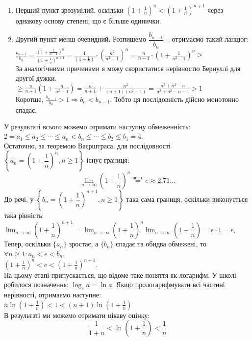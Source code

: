 \documentclass[a4paper, 14pt]{article}
\theoremstyle{theoremdd}
\theoremstyle{theoremdd}
\theoremstyle{theoremdd}
\theoremstyle{theoremdd}
\theoremstyle{theoremdd}
\theoremstyle{theoremdd}
\theoremstyle{theoremdd}
\theoremstyle{theoremdd}
\begin{document}
	\begin{enumerate}[wide=0pt, label={\alph*)}]
	\item Перший пункт зрозумілий, оскільки $\displaystyle \left(1+\frac{1}{n} \right)^n < \left(1+\frac{1}{n} \right)^{n+1}$ через однакову основу степені, що є більше одинички.
	\item Другий пункт менш очевидний. Розпишемо $\dfrac{b_{n-1}}{b_n}$ -- отримаємо такий ланцюг:\\
	$\displaystyle \frac{b_{n-1}}{b_n} = \frac{\displaystyle \left(1+\frac{1}{n-1} \right)^{n}}{\displaystyle \left(1+\frac{1}{n} \right)^{n+1}} = \frac{1}{\displaystyle \left(1+\frac{1}{n}\right)} \cdot \left(\frac{n^2}{n^2-1}\right)^n = \frac{n}{n+1} \cdot \left(1+\frac{1}{n^2-1} \right)^n \boxed{\geq}$\\
	За аналогічними причинами я можу скористатися нерівностю Бернуллі для другої дужки.\\
	$\displaystyle \boxed{\geq} \frac{n}{n+1} \left(1+\frac{n}{n^2-1}\right) = \frac{n}{n+1} + \frac{n^2}{(n+1)(n^2-1)} = \frac{n^3+n^2-n}{n^3+n^2-n-1} > 1$\\
	Коротше, $\displaystyle \frac{b_{n-1}}{b_n} > 1 \Rightarrow b_n < b_{n-1}$. Тобто ця послідовність дійсно монотонно спадає.
	\end{enumerate}
	
	У результаті всього можемо отримати наступну обмеженність:\\
	$2=a_1 \leq a_2 \leq \cdots \leq a_n < b_n \leq \cdots \leq b_2 \leq b_1 = 4$.
	\bigskip \\
	Остаточно, за теоремою Ваєрштраса, для послідовності $\left\{a_n = \left(1 + \dfrac{1}{n} \right)^n, n \geq 1 \right\}$ існує границя:
	$$\displaystyle \lim_{n \to \infty}\left(1+\frac{1}{n} \right)^n \overset{\text{позн.}}{=} e \approx 2.71...$$
	До речі, у $\left\{b_n = \left( 1 + \dfrac{1}{n} \right)^{n+1}, n \geq 1 \right\}$ така сама границя, оскільки виконується така рівність: \\ $\displaystyle\lim_{n \to \infty} \left( 1 + \dfrac{1}{n} \right)^{n+1} = \lim_{n \to \infty} \left( 1 + \dfrac{1}{n} \right)^n \lim_{n \to \infty} \left(1 + \dfrac{1}{n} \right) = e \cdot 1 = e$.
	\bigskip \\	
	Тепер, оскільки $\{a_n \}$ зростає, а $\{b_n \}$ спадає та обидва обмежені, то $\forall n \geq 1: a_n<e<b_n$.\\
	$\displaystyle \left(1+\frac{1}{n} \right)^n < e < \left(1+\frac{1}{n} \right)^{n+1}$.\\
	На цьому етапі припускається, що відоме таке поняття як логарифм. У школі робилося позначення: $\log_{e} a =\ln a$. Якщо прологарифмувати всі частині нерівності, отримаємо наступне:\\
	$\displaystyle n \ln \left(1+\frac{1}{n} \right) < 1 < (n+1) \ln \left(1+\frac{1}{n} \right)$\\
	В результаті ми можемо отримати цікаву оцінку:
	$$\frac{1}{1+n} < \ln (1+\frac{1}{n}) < \frac{1}{n}$$
	
\end{document}
